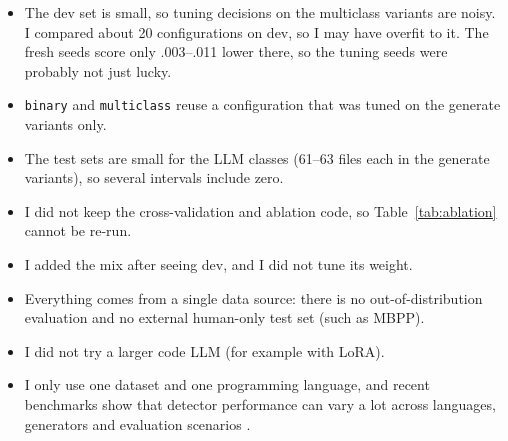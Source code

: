 \documentclass[11pt]{article}
\begin{document}
\begin{itemize}
  \item The dev set is small, so tuning decisions on the multiclass variants are noisy. I compared about 20 configurations on dev, so I may have overfit to it. The fresh seeds score only .003--.011 lower there, so the tuning seeds were probably not just lucky.
  \item \texttt{binary} and \texttt{multiclass} reuse a configuration that was tuned on the generate variants only.
  \item The test sets are small for the LLM classes (61--63 files each in the generate variants), so several intervals include zero.
  \item I did not keep the cross-validation and ablation code, so Table~\ref{tab:ablation} cannot be re-run.
  \item I added the mix after seeing dev, and I did not tune its weight.
  \item Everything comes from a single data source: there is no out-of-distribution evaluation and no external human-only test set (such as MBPP).
  \item I did not try a larger code LLM (for example with LoRA).
  \item I only use one dataset and one programming language, and recent benchmarks show that detector performance can vary a lot across languages, generators and evaluation scenarios \citep{orel-etal-2026-aicd,demirok-etal-2026-multiaigcd}.
\end{itemize}



\appendix
\end{document}
